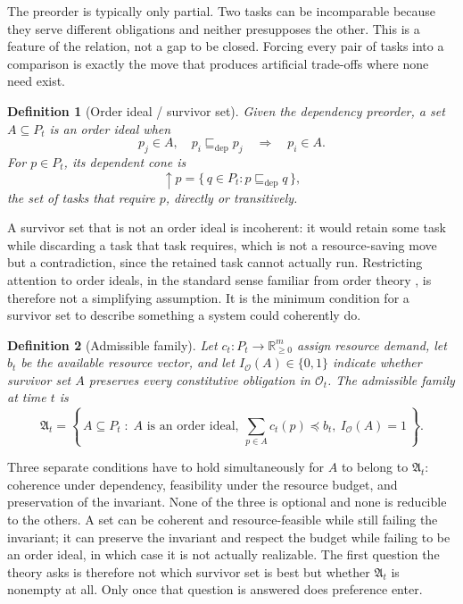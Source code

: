 \documentclass[11pt]{report}
\newtheorem{definition}{Definition}[chapter]
\begin{document}
The preorder is typically only partial. Two tasks can be incomparable because they serve different obligations and neither presupposes the other. This is a feature of the relation, not a gap to be closed. Forcing every pair of tasks into a comparison is exactly the move that produces artificial trade-offs where none need exist.

\begin{definition}[Order ideal / survivor set]
Given the dependency preorder, a set $A \subseteq P_t$ is an order ideal when
\[
p_j \in A, \quad p_i \sqsubseteq_{\mathrm{dep}} p_j \quad \Longrightarrow \quad p_i \in A.
\]
For $p \in P_t$, its dependent cone is
\[
\uparrow p = \{\, q \in P_t : p \sqsubseteq_{\mathrm{dep}} q \,\},
\]
the set of tasks that require $p$, directly or transitively.
\end{definition}

A survivor set that is not an order ideal is incoherent: it would retain some task while discarding a task that task requires, which is not a resource-saving move but a contradiction, since the retained task cannot actually run. Restricting attention to order ideals, in the standard sense familiar from order theory \cite{davey2002}, is therefore not a simplifying assumption. It is the minimum condition for a survivor set to describe something a system could coherently do.

\begin{definition}[Admissible family]
Let $c_t : P_t \to \mathbb{R}_{\ge 0}^m$ assign resource demand, let $b_t$ be the available resource vector, and let $I_{\mathcal O}(A) \in \{0,1\}$ indicate whether survivor set $A$ preserves every constitutive obligation in $\mathcal O_t$. The admissible family at time $t$ is
\[
\mathfrak A_t = \left\{\, A \subseteq P_t \;:\; A \text{ is an order ideal},\ \sum_{p \in A} c_t(p) \preceq b_t,\ I_{\mathcal O}(A) = 1 \,\right\}.
\]
\end{definition}

Three separate conditions have to hold simultaneously for $A$ to belong to $\mathfrak A_t$: coherence under dependency, feasibility under the resource budget, and preservation of the invariant. None of the three is optional and none is reducible to the others. A set can be coherent and resource-feasible while still failing the invariant; it can preserve the invariant and respect the budget while failing to be an order ideal, in which case it is not actually realizable. The first question the theory asks is therefore not which survivor set is best but whether $\mathfrak A_t$ is nonempty at all. Only once that question is answered does preference enter.
\end{document}
